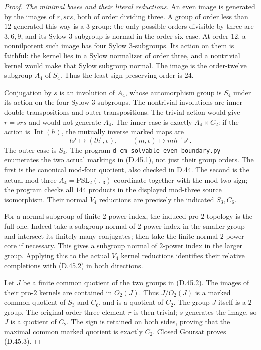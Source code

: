 \begin{proof}
\emph{The minimal bases and their literal reductions.}
An even image is generated by the images of \(r,srs\),
both of order dividing three. A group of order less
than \(12\) generated this way is a \(3\)-group:
the only possible orders divisible by three are
\(3,6,9\), and its Sylow \(3\)-subgroup is normal
in the order-six case. At order \(12\), a
nonnilpotent such image has four Sylow
\(3\)-subgroups. Its action on them is faithful:
the kernel lies in a Sylow normalizer of order
three, and a nontrivial kernel would make that
Sylow subgroup normal. The image is the
order-twelve subgroup \(A_4\) of \(S_4\).
Thus the least sign-preserving order is \(24\).

Conjugation by \(s\) is an involution of
\(A_4\), whose automorphism group is \(S_4\)
under its action on the four Sylow
\(3\)-subgroups. The nontrivial involutions
are inner double transpositions and outer
transpositions. The trivial action would
give \(r=srs\) and would not generate
\(A_4\). The inner case is exactly
\(A_4\times C_2\): if the action is
\(\operatorname{Int}(h)\), the mutually
inverse marked maps are
\[
    l s^\epsilon\longmapsto(lh^\epsilon,\epsilon),
       \qquad
    (m,\epsilon)\longmapsto mh^{-\epsilon}s^\epsilon.
\]
The outer case is \(S_4\). The program
\texttt{d\_cm\_solvable\_even\_boundary.py}
enumerates the two actual markings in
(D.45.1), not just their group orders.
The first is the canonical mod-four
quotient, also checked in D.44. The
second is the actual mod-three
\(A_4=\mathrm{PSL}_2(\mathbb F_3)\)
coordinate together with the mod-two
sign; the program checks all \(144\)
products in the displayed mod-three
source isomorphism. Their normal \(V_4\) reductions
are precisely the indicated \(S_3,C_6\).

For a normal subgroup of finite \(2\)-power
index, the induced pro-\(2\) topology is
the full one. Indeed take a subgroup
normal of \(2\)-power index in the
smaller group and intersect its finitely
many conjugates; then take the finite
normal \(2\)-power core if necessary.
This gives a subgroup normal of
\(2\)-power index in the larger group.
Applying this to the actual \(V_4\)
kernel reductions identifies their
relative completions with (D.45.2)
in both directions.

Let \(J\) be a finite common quotient
of the two groups in (D.45.2).
The images of their pro-\(2\) kernels
are contained in \(O_2(J)\).
Thus \(J/O_2(J)\) is a marked common
quotient of \(S_3\) and \(C_6\), and
is a quotient of \(C_2\). The group
\(J\) itself is a \(2\)-group.
The original order-three element
\(r\) is then trivial; \(s\) generates
the image, so \(J\) is a quotient
of \(C_2\). The sign is retained
on both sides, proving that the
maximal common marked quotient
is exactly \(C_2\). Closed Goursat
proves (D.45.3).


\end{proof}
